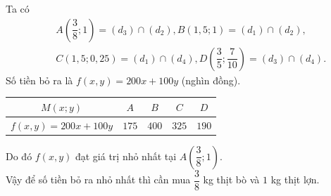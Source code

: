 \begin{vd}
{\begin{center}
		\end{center}
		Ta có 
		{\allowdisplaybreaks
			\begin{eqnarray*}
				&&A\left(\dfrac{3}{8};1\right)=(d_3) \cap (d_2), B(1{,}5;1)=(d_1) \cap (d_2),\\
				&&C(1{,}5;0{,}25)=(d_1) \cap (d_4), D\left(\dfrac{3}{5};\dfrac{7}{10}\right)=(d_3) \cap (d_4).
			\end{eqnarray*}
		}
		Số tiền bỏ ra là $f(x,y)=200x+100y$ (nghìn đồng).
		\begin{center}
			\renewcommand\arraystretch{1.6}
			\renewcommand{\tabcolsep}{6mm}
			\begin{tabular}{|c|c|c|c|c|}
				\hline 
				$M(x;y)$& $A$ & $B$ & $C$ & $D$ \\ 
				\hline 
				$f(x,y)=200x+100y$& $175$ & $400$ & $325$ & $190$ \\ 
				\hline 
			\end{tabular} 
		\end{center}
		Do đó $f(x,y)$ đạt giá trị nhỏ nhất tại $A\left(\dfrac{3}{8};1\right)$.\\
		Vậy để số tiền bỏ ra nhỏ nhất thì cần mua $\dfrac{3}{8}$ kg thịt bò và $1$ kg thịt lợn.
	}
\end{vd}

